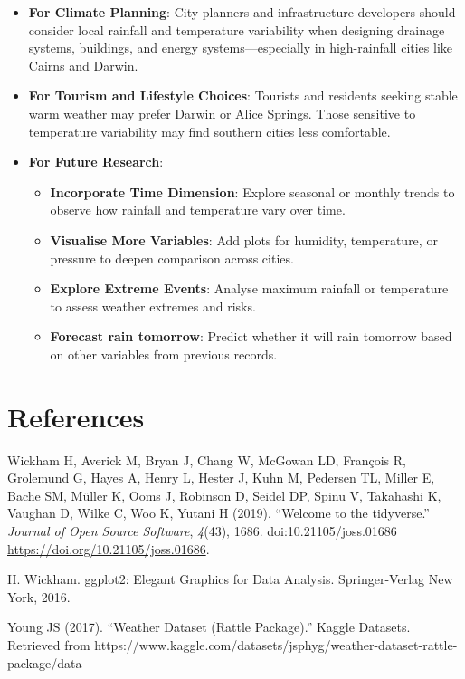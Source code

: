 \documentclass[
  letterpaper,
  DIV=11,
  numbers=noendperiod]{scrartcl}
\begin{document}
\begin{itemize}
\item
  \textbf{For Climate Planning}: City planners and infrastructure
  developers should consider local rainfall and temperature variability
  when designing drainage systems, buildings, and energy
  systems---especially in high-rainfall cities like Cairns and Darwin.
\item
  \textbf{For Tourism and Lifestyle Choices}: Tourists and residents
  seeking stable warm weather may prefer Darwin or Alice Springs. Those
  sensitive to temperature variability may find southern cities less
  comfortable.
\item
  \textbf{For Future Research}:

  \begin{itemize}
  \item
    \textbf{Incorporate Time Dimension}: Explore seasonal or monthly
    trends to observe how rainfall and temperature vary over time.
  \item
    \textbf{Visualise More Variables}: Add plots for humidity,
    temperature, or pressure to deepen comparison across cities.
  \item
    \textbf{Explore Extreme Events}: Analyse maximum rainfall or
    temperature to assess weather extremes and risks.
  \item
    \textbf{Forecast rain tomorrow}: Predict whether it will rain
    tomorrow based on other variables from previous records.
  \end{itemize}
\end{itemize}

\section{References}\label{references}

Wickham H, Averick M, Bryan J, Chang W, McGowan LD, François R,
Grolemund G, Hayes A, Henry L, Hester J, Kuhn M, Pedersen TL, Miller E,
Bache SM, Müller K, Ooms J, Robinson D, Seidel DP, Spinu V, Takahashi K,
Vaughan D, Wilke C, Woo K, Yutani H (2019). ``Welcome to the
tidyverse.'' \emph{Journal of Open Source Software}, \emph{4}(43), 1686.
doi:10.21105/joss.01686 \url{https://doi.org/10.21105/joss.01686}.

H. Wickham. ggplot2: Elegant Graphics for Data Analysis. Springer-Verlag
New York, 2016.

Young JS (2017). ``Weather Dataset (Rattle Package).'' Kaggle Datasets.
Retrieved from
https://www.kaggle.com/datasets/jsphyg/weather-dataset-rattle-package/data
\end{document}
